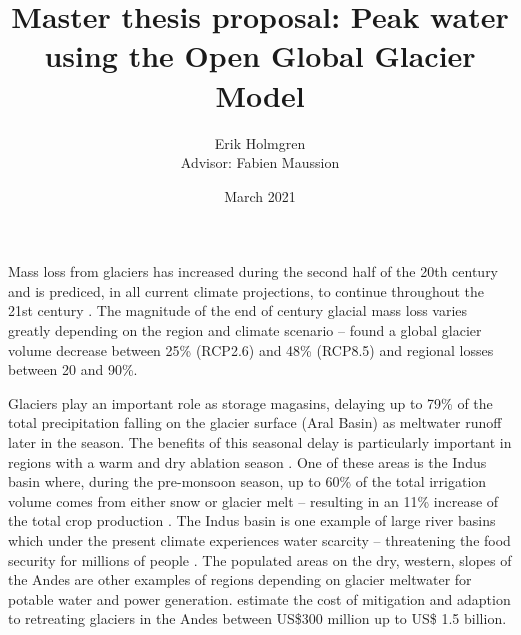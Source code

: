 \documentclass[12pt, a4paper]{article}
\author{Erik Holmgren \\ Advisor: Fabien Maussion}
\title{Master thesis proposal: Peak water using the Open Global Glacier Model}
\date{March 2021}
\begin{document}
\maketitle
\noindent
Mass loss from glaciers has increased during the second half of the 20th century
\parencite{vaughanObservationsCryosphere2013} and is prediced, in all current
climate projections, to continue throughout the 21st century
\parencite{ipccClimateChange20142014}. The magnitude of the end of century
glacial mass loss varies greatly depending on the region and climate scenario --
\textcite{hussNewModelGlobal2015} found a global glacier volume decrease between
25\% (RCP2.6) and 48\% (RCP8.5) and regional losses between 20 and 90\%.



Glaciers play an important role as storage magasins, delaying up to 79\% of the
total precipitation falling on the glacier surface (Aral Basin) as meltwater
runoff later in the season. The benefits of this seasonal delay is particularly
important in regions with a warm and dry ablation season
\parencite{kaserContributionPotentialGlaciers2010}. One of these areas is the
Indus basin where, during the pre-monsoon season, up to 60\% of the total
irrigation volume comes from either snow or glacier melt -- resulting in an 11\%
increase of the total crop production
\parencite{biemansImportanceSnowGlacier2019}. The Indus basin is one example of
large river basins which under the present climate experiences water scarcity --
threatening the food security for millions of people
\parencite{kummuClimatedrivenInterannualVariability2014}. The populated areas on
the dry, western, slopes of the Andes are other examples of regions depending on
glacier meltwater for potable water and power generation.
\textcite{vergaraEconomicImpactsRapid2007} estimate the cost of mitigation and
adaption to retreating glaciers in the Andes between US\$300 million up to US\$
1.5 billion.
\end{document}
